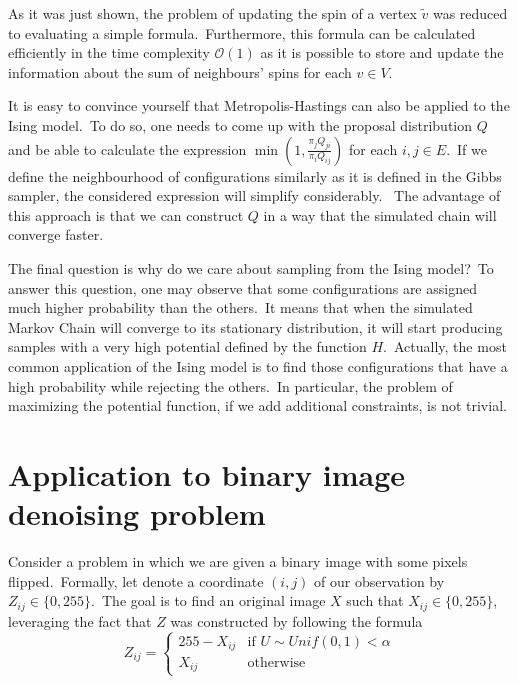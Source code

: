 \documentclass[a4paper, 11pt, onecolumn, openany, titlepage]{report}
\theoremstyle{default_theorem_style}\newtheorem{theorem}{Theorem}
\theoremstyle{default_theorem_style}\newtheorem{definition}{Definition}
\begin{document}
As it was just shown, the problem of updating the spin of a vertex $\tilde{v}$ was reduced to evaluating a simple
formula.\ Furthermore, this formula can be calculated efficiently in the time complexity $\mathcal{O}(1)$ as it is
possible to store and update the information about the sum of neighbours' spins for each $v \in V$.\newline

It is easy to convince yourself that Metropolis-Hastings can also be applied to the Ising model.\ To do so, one needs
to come up with the proposal distribution $Q$ and be able to calculate the expression
$\min{(1, \frac{\pi_j Q_{ji}}{\pi_i Q_{ij}})}$ for each $i, j \in E$.\ If we define the neighbourhood of configurations
similarly as it is defined in the Gibbs sampler, the considered expression will simplify considerably. \ The
advantage of this approach is that we can construct $Q$ in a way that the simulated chain will converge faster.\newline

The final question is why do we care about sampling from the Ising model?\ To answer this question, one may observe
that some configurations are assigned much higher probability than the others.\ It means that when the simulated
Markov Chain will converge to its stationary distribution, it will start producing samples with a very high potential
defined by the function $H$.\ Actually, the most common application of the Ising model is to find those configurations
that have a high probability while rejecting the others.\ In particular, the problem of maximizing the potential
function, if we add additional constraints, is not trivial.

\section{Application to binary image denoising problem}\label{section:binary_images_problem}

Consider a problem in which we are given a binary image with some pixels flipped.\ Formally, let denote a coordinate
$(i, j)$ of our observation by $Z_{ij} \in \{0, 255\}$.\ The goal is to find an original image $X$ such that
$X_{ij} \in \{0, 255\}$, leveraging the fact that $Z$ was constructed by following the formula
$$
Z_{ij} =
\begin{cases}
  255 - X_{ij} &\text{if $U \sim Unif(0, 1) < \alpha$}\\
  X_{ij} &\text{otherwise}
\end{cases}
$$
\end{document}
